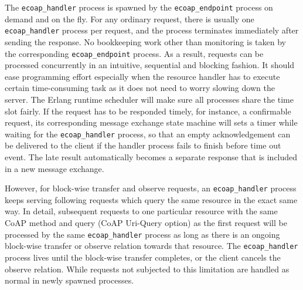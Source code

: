 The \verb|ecoap_handler| process is spawned by the \verb|ecoap_endpoint| process on demand and on the fly. For any ordinary request, there is usually one \verb|ecoap_handler| process per request, and the process terminates immediately after sending the response. No  bookkeeping work other than monitoring is taken by the corresponding \verb|ecoap_endpoint| process. As a result, requests can be processed concurrently in an intuitive, sequential and blocking fashion. It should ease programming effort especially when the resource handler has to execute certain time-consuming task as it does not need to worry slowing down the server. The Erlang runtime scheduler will make sure all processes share the time slot fairly. If the request has to be responded timely, for instance, a confirmable request, its corresponding message exchange state machine will sets a timer while waiting for the \verb|ecoap_handler| process, so that an empty acknowledgement can be delivered to the client if the handler process fails to finish before time out event. The late result automatically becomes a separate response that is included in a new message exchange. 

However, for block-wise transfer and observe requests, an \verb|ecoap_handler| process keeps serving following requests which query the same resource in the exact same way. In detail, subsequent requests to one particular resource with the same CoAP method and query (CoAP Uri-Query option) as the first request will be processed by the same \verb|ecoap_handler| process as long as there is an ongoing block-wise transfer or observe relation towards that resource. The \verb|ecoap_handler| process lives until the block-wise transfer completes, or the client cancels the observe relation. While requests not subjected to this limitation are handled as normal in newly spawned processes.

